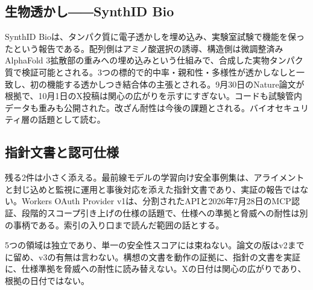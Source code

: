 \subsection*{生物透かし――SynthID Bio}
SynthID Bioは、タンパク質に電子透かしを埋め込み、実験室試験で機能を保ったという報告である\cite{synthidbio}。配列側はアミノ酸選択の誘導、構造側は微調整済みAlphaFold 3拡散部の重みへの埋め込みという仕組みで、合成した実物タンパク質で検証可能とされる。3つの標的で的中率・親和性・多様性が透かしなしと一致し、初の機能する透かしつき結合体の主張とされる。9月30日のNature論文が根拠で、10月1日のX投稿は関心の広がりを示すにすぎない。コードも試験管内データも重みも公開された。改ざん耐性は今後の課題とされる。バイオセキュリティ層の話題として読む。

\subsection*{指針文書と認可仕様}
残る2件は小さく添える。最前線モデルの学習向け安全事例集は、アライメントと封じ込めと監視に運用と事後対応を添えた指針文書であり、実証の報告ではない\cite{safetycases}。Workers OAuth Provider v1は、分割されたAPIと2026年7月28日のMCP認証、段階的スコープ引き上げの仕様の話題で、仕様への準拠と脅威への耐性は別の事柄である\cite{mcpauth}。索引の入り口まで読んだ範囲の話とする。

\begin{claimboundary}[資料と評価の境界]
5つの領域は独立であり、単一の安全性スコアには束ねない。論文の版はv2までに留め、v3の有無は言わない。構想の文書を動作の証拠に、指針の文書を実証に、仕様準拠を脅威への耐性に読み替えない。Xの日付は関心の広がりであり、根拠の日付ではない。
\end{claimboundary}
